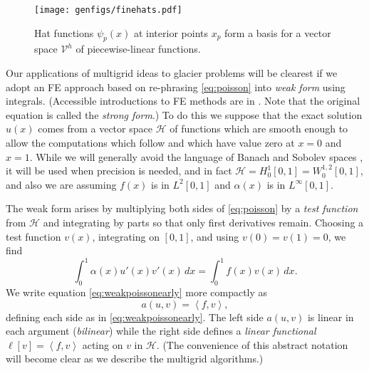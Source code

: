 \documentclass[letterpaper,final,12pt,reqno]{amsart}
\theoremstyle{claim}
\newcommand{\ip}[2]{\left<#1,#2\right>}
\numberwithin{equation}{section}
\numberwithin{figure}{section}
\numberwithin{table}{section}
\begin{document}
\begin{figure}
\texttt{[image: genfigs/finehats.pdf]}
\caption{Hat functions $\psi_p(x)$ at interior points $x_p$ form a basis for a vector space $\mathcal{V}^h$ of piecewise-linear functions.}
\label{fig:finehats}
\end{figure}

Our applications of multigrid ideas to glacier problems will be clearest if we adopt an FE approach based on re-phrasing \eqref{eq:poisson} into \emph{weak form} using integrals.  (Accessible introductions to FE methods are in \cite{Bueler2021,Elmanetal2014,Johnson2009}.  Note that the original equation is called the \emph{strong form}.)  To do this we suppose that the exact solution $u(x)$ comes from a vector space $\mathcal{H}$ of functions which are smooth enough to allow the computations which follow and which have value zero at $x=0$ and $x=1$.  While we will generally avoid the language of Banach and Sobolev spaces \cite[for example]{Evans2010}, it will be used when precision is needed, and in fact $\mathcal{H}=H_0^1[0,1]=W_0^{1,2}[0,1]$, and also we are assuming $f(x)$ is in $L^2[0,1]$ and $\alpha(x)$ is in $L^\infty[0,1]$.

The weak form arises by multiplying both sides of \eqref{eq:poisson} by a \emph{test function} from $\mathcal{H}$ and integrating by parts so that only first derivatives remain.  Choosing a test function $v(x)$, integrating on $[0,1]$, and using $v(0)=v(1)=0$, we find
\begin{equation}
\int_0^1 \alpha(x) u'(x) v'(x)\,dx = \int_0^1 f(x) v(x)\, dx.  \label{eq:weakpoissonearly}
\end{equation}
We write equation \eqref{eq:weakpoissonearly} more compactly as
\begin{equation}
  a(u,v) = \ip{f}{v}, \label{eq:weakpoisson}
\end{equation}
defining each side as in \eqref{eq:weakpoissonearly}.  The left side $a(u,v)$ is linear in each argument (\emph{bilinear}) while the right side defines a \emph{linear functional} $\ell[v] = \ip{f}{v}$ acting on $v$ in $\mathcal{H}$.  (The convenience of this abstract notation will become clear as we describe the multigrid algorithms.)
\end{document}
